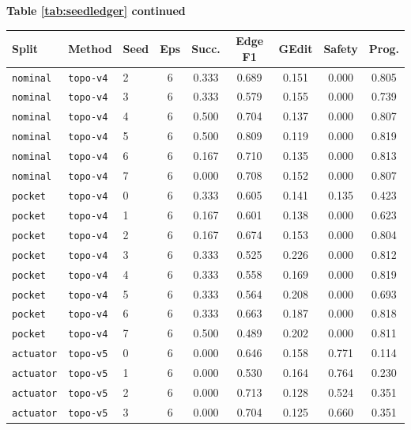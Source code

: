 \documentclass{article}
\begin{document}
\begin{center}
\textbf{Table \ref{tab:seedledger} continued}\\[0.4ex]
\begin{tabular}{lllcccccc}
\toprule
Split & Method & Seed & Eps & Succ. & Edge F1 & GEdit & Safety & Prog. \\
\midrule
\texttt{nominal} & \texttt{topo-v4} & 2 & 6 & 0.333 & 0.689 & 0.151 & 0.000 & 0.805 \\
\texttt{nominal} & \texttt{topo-v4} & 3 & 6 & 0.333 & 0.579 & 0.155 & 0.000 & 0.739 \\
\texttt{nominal} & \texttt{topo-v4} & 4 & 6 & 0.500 & 0.704 & 0.137 & 0.000 & 0.807 \\
\texttt{nominal} & \texttt{topo-v4} & 5 & 6 & 0.500 & 0.809 & 0.119 & 0.000 & 0.819 \\
\texttt{nominal} & \texttt{topo-v4} & 6 & 6 & 0.167 & 0.710 & 0.135 & 0.000 & 0.813 \\
\texttt{nominal} & \texttt{topo-v4} & 7 & 6 & 0.000 & 0.708 & 0.152 & 0.000 & 0.807 \\
\texttt{pocket} & \texttt{topo-v4} & 0 & 6 & 0.333 & 0.605 & 0.141 & 0.135 & 0.423 \\
\texttt{pocket} & \texttt{topo-v4} & 1 & 6 & 0.167 & 0.601 & 0.138 & 0.000 & 0.623 \\
\texttt{pocket} & \texttt{topo-v4} & 2 & 6 & 0.167 & 0.674 & 0.153 & 0.000 & 0.804 \\
\texttt{pocket} & \texttt{topo-v4} & 3 & 6 & 0.333 & 0.525 & 0.226 & 0.000 & 0.812 \\
\texttt{pocket} & \texttt{topo-v4} & 4 & 6 & 0.333 & 0.558 & 0.169 & 0.000 & 0.819 \\
\texttt{pocket} & \texttt{topo-v4} & 5 & 6 & 0.333 & 0.564 & 0.208 & 0.000 & 0.693 \\
\texttt{pocket} & \texttt{topo-v4} & 6 & 6 & 0.333 & 0.663 & 0.187 & 0.000 & 0.818 \\
\texttt{pocket} & \texttt{topo-v4} & 7 & 6 & 0.500 & 0.489 & 0.202 & 0.000 & 0.811 \\
\texttt{actuator} & \texttt{topo-v5} & 0 & 6 & 0.000 & 0.646 & 0.158 & 0.771 & 0.114 \\
\texttt{actuator} & \texttt{topo-v5} & 1 & 6 & 0.000 & 0.530 & 0.164 & 0.764 & 0.230 \\
\texttt{actuator} & \texttt{topo-v5} & 2 & 6 & 0.000 & 0.713 & 0.128 & 0.524 & 0.351 \\
\texttt{actuator} & \texttt{topo-v5} & 3 & 6 & 0.000 & 0.704 & 0.125 & 0.660 & 0.351 \\

\end{tabular}
\end{center}
\end{document}
